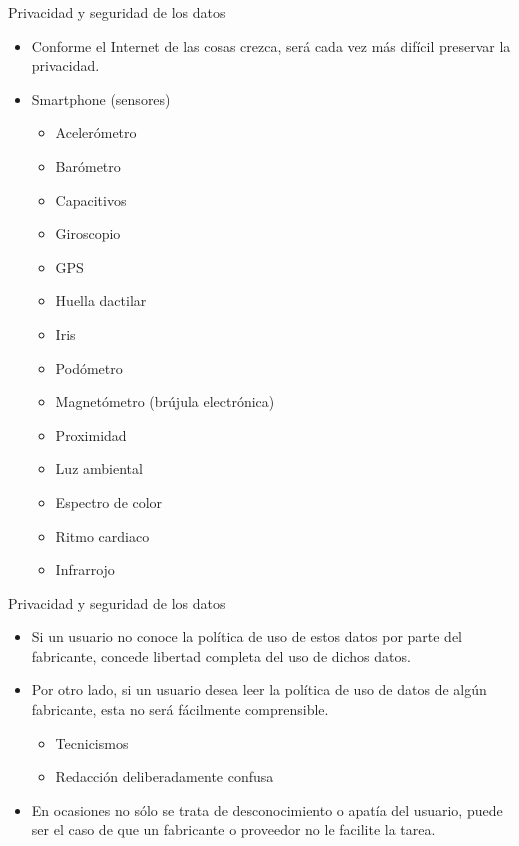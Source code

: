 \documentclass[11pt,aspectratio=169]{beamer}
\begin{document}
\begin{frame}{Privacidad y seguridad de los datos}
    \begin{itemize}
        \item Conforme el Internet de las cosas crezca, será cada vez más difícil preservar la privacidad. \pause
        \item Smartphone (sensores)
            \begin{itemize}
                \item Acelerómetro\pause
                \item Barómetro\pause
                \item Capacitivos\pause
                \item Giroscopio\pause
                \item GPS\pause
                \item Huella dactilar\pause
                \item Iris\pause
                \item Podómetro\pause
                \item Magnetómetro (brújula electrónica)\pause
                \item Proximidad\pause
                \item Luz ambiental\pause
                \item Espectro de color\pause
                \item Ritmo cardiaco\pause
                \item Infrarrojo
            \end{itemize}
    \end{itemize}
\end{frame}
    
\begin{frame}{Privacidad y seguridad de los datos}
    \begin{itemize}
        \item Si un usuario no conoce la política de uso de estos datos por parte del fabricante, concede libertad completa del uso de dichos datos.\pause
        \item Por otro lado, si un usuario desea leer la política de uso de datos de algún fabricante, esta no será fácilmente comprensible. \pause
            \begin{itemize}
                \item Tecnicismos\pause
                \item Redacción deliberadamente confusa\pause
            \end{itemize}
        \item En ocasiones no sólo se trata de desconocimiento o apatía del usuario, puede ser el caso de que un fabricante o proveedor no le facilite la tarea.
    
    \end{itemize}
\end{frame}
\end{document}
